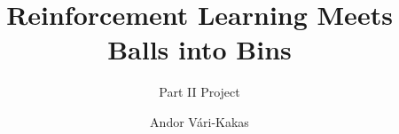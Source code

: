 \title{Reinforcement Learning Meets Balls into Bins}




\subtitle{Part II Project}
\author{Andor Vári-Kakas}
\renewcommand{\crest}{}
\renewcommand{\submissiontext}{}

